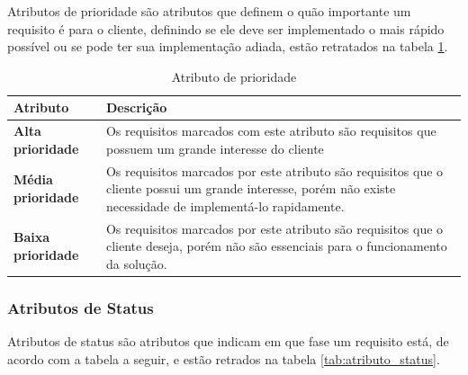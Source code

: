 Atributos de prioridade são atributos que definem o quão importante um requisito é para o cliente, definindo se ele deve ser implementado o mais rápido possível ou se pode ter sua implementação adiada, estão retratados na tabela \ref{tab:atributo_prioridade}.

\begin{table}[H]
\begin{tabular}{|p{4cm}|p{11cm}|}

\hline
\textbf{Atributo} &
\textbf{Descrição}
\\ \hline

\textbf{Alta prioridade} &
Os requisitos marcados com este atributo são requisitos que possuem um grande interesse do cliente
\\ \hline

\textbf{Média prioridade} &
Os requisitos marcados por este atributo são requisitos que o cliente possui um grande interesse, porém não existe necessidade de implementá-lo rapidamente.
\\ \hline

\textbf{Baixa prioridade} &
Os requisitos marcados por este atributo são requisitos que o cliente deseja, porém não são essenciais para o funcionamento da solução.
\\ \hline

\end{tabular}
\caption{Atributo de prioridade}
\label{tab:atributo_prioridade}
\end{table}

\subsubsection{Atributos de Status}

Atributos de status são atributos que indicam em que fase um requisito está, de acordo com a tabela a seguir, e estão retrados na tabela \ref{tab:atributo_status}.

